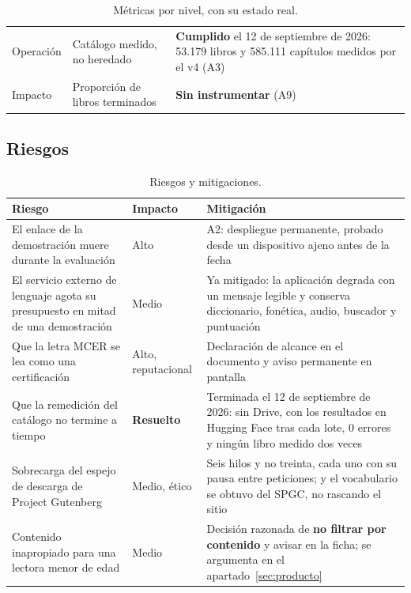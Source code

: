 \documentclass[11pt,a4paper]{article}
\begin{document}
\begin{table}[H]
\begin{tabularx}{\textwidth}{@{}L{1.9cm} L{6.0cm} Y@{}}
Operación & Catálogo medido, no heredado & \textbf{Cumplido} el 12 de septiembre de 2026: 53.179 libros y 585.111 capítulos medidos por el v4 (A3) \\
Impacto & Proporción de libros terminados & \textbf{Sin instrumentar} (A9) \\
\bottomrule
\end{tabularx}
\caption{Métricas por nivel, con su estado real.}
\label{cuad:metricas}
\end{table}

\subsection{Riesgos}

\begin{table}[H]
\centering
\small
\begin{tabularx}{\textwidth}{@{}L{5.2cm} L{2.4cm} Y@{}}
\toprule
\textbf{Riesgo} & \textbf{Impacto} & \textbf{Mitigación} \\
\midrule
El enlace de la demostración muere durante la evaluación & Alto & A2: despliegue permanente, probado desde un dispositivo ajeno antes de la fecha \\
El servicio externo de lenguaje agota su presupuesto en mitad de una demostración & Medio & Ya mitigado: la aplicación degrada con un mensaje legible y conserva diccionario, fonética, audio, buscador y puntuación \\
Que la letra MCER se lea como una certificación & Alto, reputacional & Declaración de alcance en el documento y aviso permanente en pantalla \\
Que la remedición del catálogo no termine a tiempo & \textbf{Resuelto} & Terminada el 12 de septiembre de 2026: sin Drive, con los resultados en Hugging Face tras cada lote, 0 errores y ningún libro medido dos veces \\
Sobrecarga del espejo de descarga de Project Gutenberg & Medio, ético & Seis hilos y no treinta, cada uno con su pausa entre peticiones; y el vocabulario se obtuvo del SPGC, no rascando el sitio \\
Contenido inapropiado para una lectora menor de edad & Medio & Decisión razonada de \textbf{no filtrar por contenido} y avisar en la ficha; se argumenta en el apartado~\ref{sec:producto} \\
\bottomrule
\end{tabularx}
\caption{Riesgos y mitigaciones.}
\label{cuad:riesgos}
\end{table}
\end{document}
